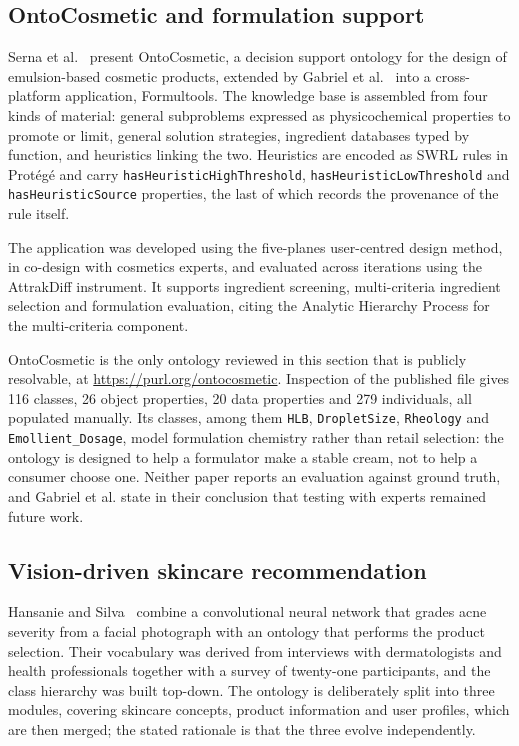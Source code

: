 \subsection{OntoCosmetic and formulation support}
\label{ssec:rw-ontocosmetic}

Serna et al.~\cite{serna2021} present OntoCosmetic, a decision support ontology
for the design of emulsion-based cosmetic products, extended by Gabriel et
al.~\cite{gabriel2023} into a cross-platform application, Formultools. The
knowledge base is assembled from four kinds of material: general subproblems
expressed as physicochemical properties to promote or limit, general solution
strategies, ingredient databases typed by function, and heuristics linking the
two. Heuristics are encoded as SWRL rules in Prot\'eg\'e and carry
\texttt{hasHeuristicHighThreshold}, \texttt{hasHeuristicLowThreshold} and
\texttt{hasHeuristicSource} properties, the last of which records the provenance
of the rule itself.

The application was developed using the five-planes user-centred design
method, in co-design with cosmetics experts, and evaluated across iterations
using the AttrakDiff instrument. It supports ingredient screening, multi-criteria
ingredient selection and formulation evaluation, citing the Analytic Hierarchy
Process for the multi-criteria component.

OntoCosmetic is the only ontology reviewed in this section that is publicly
resolvable, at \url{https://purl.org/ontocosmetic}. Inspection of the published
file gives 116 classes, 26 object properties, 20 data properties and 279
individuals, all populated manually. Its classes, among them \texttt{HLB},
\texttt{DropletSize}, \texttt{Rheology} and \texttt{Emollient\_Dosage}, model
formulation chemistry rather than retail selection: the ontology is designed to
help a formulator make a stable cream, not to help a consumer choose one.
Neither paper reports an evaluation against ground truth, and Gabriel et al.
state in their conclusion that testing with experts remained future work.

\subsection{Vision-driven skincare recommendation}
\label{ssec:rw-hansanie}

Hansanie and Silva~\cite{hansanie2024} combine a convolutional neural network
that grades acne severity from a facial photograph with an ontology that
performs the product selection. Their vocabulary was derived from interviews
with dermatologists and health professionals together with a survey of
twenty-one participants, and the class hierarchy was built top-down. The
ontology is deliberately split into three modules, covering skincare concepts,
product information and user profiles, which are then merged; the stated
rationale is that the three evolve independently.

